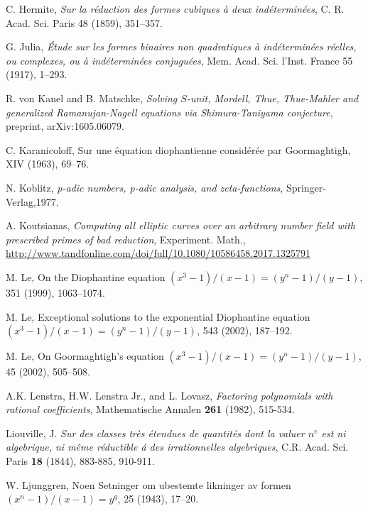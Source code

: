 \begin{thebibliography}{}
C. Hermite,
\emph{Sur la r\'eduction des formes cubiques \`a deux ind\'etermin\'ees},
C. R. Acad. Sci. Paris 48 (1859), 351--357.

G. Julia,
\emph{\'Etude sur les formes binaires non quadratiques \`a ind\'etermin\'ees r\'eelles, ou complexes, ou \`a 
ind\'etermin\'ees conjugu\'ees},
Mem. Acad. Sci. l'Inst. France 55 (1917), 1--293.

R. von Kanel and B. Matschke,
\emph{Solving $S$-unit, Mordell, Thue, Thue-Mahler and generalized Ramanujan-Nagell equations via Shimura-Taniyama conjecture}, 
preprint, arXiv:1605.06079.

C. Karanicoloff,
\newblock Sur une \'equation diophantienne consid\'er\'ee par Goormaghtigh,
 XIV (1963), 69--76.

N. Koblitz, 
\emph{p-adic numbers, p-adic analysis, and zeta-functions}, 
Springer-Verlag,1977.

A. Koutsianas,
\emph{Computing all elliptic curves over an arbitrary number field with prescribed primes of bad reduction}, 
Experiment. Math., \url{http://www.tandfonline.com/doi/full/10.1080/10586458.2017.1325791}

M. Le,
\newblock On the Diophantine equation $(x^3-1)/(x-1)=(y^n-1)/(y-1)$,
 351 (1999), 1063--1074.

M. Le,
\newblock Exceptional solutions to the exponential Diophantine equation $(x^3-1)/(x-1)=(y^n-1)/(y-1)$,
  543 (2002), 187--192.

M. Le,
\newblock On Goormaghtigh's equation $(x^3-1)/(x-1)=(y^n-1)/(y-1)$,
 45 (2002), 505--508.

A.K. Lenstra, H.W. Lenstra Jr., and L. Lovasz, 
\emph{Factoring polynomials with rational coefficients}, 
Mathematische Annalen \textbf{261} (1982), 515-534.

Liouville, J.
\emph{Sur des classes tr\`es \'etendues de quantit\'es dont la valuer $n^e$ est ni algebrique, ni m\^eme r\'eductible \'a des irrationnelles algebriques},
C.R. Acad. Sci. Paris \textbf{18} (1844), 883-885, 910-911.

W. Ljunggren,
\newblock Noen Setninger om ubestemte likninger av formen $(x^n-1)/(x-1)=y^q$,
 25 (1943), 17--20.


\end{thebibliography}
